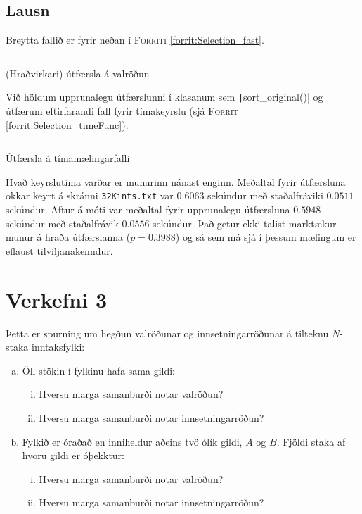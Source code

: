 \documentclass[12pt, a4paper, hidelinks]{article}
\begin{document}
\subsection*{Lausn}
Breytta fallið er fyrir neðan í \textsc{Forriti} \ref{forrit:Selection_fast}.

\begin{listing}[H]
    \centering
    \inputminted[linenos, frame=single, firstline=13, lastline=24, fontsize=\footnotesize]{java}{../src/V2/Selection.java}
    \caption{(Hraðvirkari) útfærsla á valröðun}
    \label{forrit:Selection_fast}
\end{listing}
\noindent
Við höldum upprunalegu útfærslunni í klasanum sem \texttt|sort_original()| og útfærum
eftirfarandi fall fyrir tímakeyrslu (sjá \textsc{Forrit} \ref{forrit:Selection_timeFunc}).

\begin{listing}[H]
    \centering
    \inputminted[firstline=122, lastline=128, frame=single, linenos, fontsize=\footnotesize]{java}{../src/V2/Selection.java}
    \caption{Útfærsla á tímamælingarfalli}
    \label{forrit:Selection_timeFunc}
\end{listing}

\noindent
Hvað keyrslutíma varðar er munurinn nánast enginn. Meðaltal fyrir útfærsluna okkar keyrt á skránni \texttt{32Kints.txt} 
var $0.6063$ sekúndur með staðalfráviki $0.0511$ sekúndur. Aftur á móti var meðaltal fyrir upprunalegu útfærsluna $0.5948$
sekúndur með staðalfrávik $0.0556$ sekúndur. Það getur ekki talist marktækur munur á hraða útfærslanna ($p = 0.3988$) og sá sem má sjá í þessum
mælingum er eflaust tilviljanakenndur.

\newpage

\section*{Verkefni 3}
Þetta er spurning um hegðun valröðunar og innsetningarröðunar á tilteknu $N$-staka inntaksfylki:
\begin{enumerate}[(a)]
    \item Öll stökin í fylkinu hafa sama gildi:
    \begin{enumerate}[(i)]
        \item Hversu marga samanburði notar valröðun?
        \item Hversu marga samanburði notar innsetningarröðun?
    \end{enumerate}
    \item Fylkið er óraðað en inniheldur aðeins tvö ólík gildi, $A$ og $B$. Fjöldi staka af hvoru
    gildi er óþekktur:
    \begin{enumerate}[(i)]
        \item Hversu marga samanburði notar valröðun?
        \item Hversu marga samanburði notar innsetningarröðun?
    \end{enumerate}
\end{enumerate}
\end{document}
